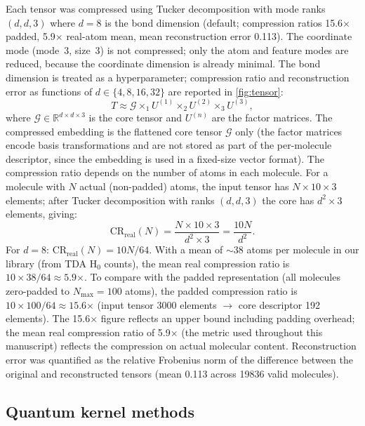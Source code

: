\documentclass[11pt,a4paper]{article}
\begin{document}
Each tensor was compressed using Tucker decomposition \citep{tensorly_2019} with mode ranks $(d, d, 3)$ where $d = 8$ is the bond dimension (default; compression ratios \num{15.6}$\times$ padded, \num{5.9}$\times$ real-atom mean, mean reconstruction error \num{0.113}). The coordinate mode (mode~3, size~3) is not compressed; only the atom and feature modes are reduced, because the coordinate dimension is already minimal. The bond dimension is treated as a hyperparameter; compression ratio and reconstruction error as functions of $d \in \{4, 8, 16, 32\}$ are reported in \cref{fig:tensor}:
\begin{equation}
T \approx \mathcal{G} \times_1 U^{(1)} \times_2 U^{(2)} \times_3 U^{(3)},
\end{equation}
where $\mathcal{G} \in \mathbb{R}^{d \times d \times 3}$ is the core tensor and $U^{(n)}$ are the factor matrices. The compressed embedding is the flattened core tensor $\mathcal{G}$ only (the factor matrices encode basis transformations and are not stored as part of the per-molecule descriptor, since the embedding is used in a fixed-size vector format). The compression ratio depends on the number of atoms in each molecule. For a molecule with $N$ actual (non-padded) atoms, the input tensor has $N \times 10 \times 3$ elements; after Tucker decomposition with ranks $(d, d, 3)$ the core has $d^2 \times 3$ elements, giving:
\begin{equation}
\mathrm{CR}_{\text{real}}(N) = \frac{N \times 10 \times 3}{d^2 \times 3} = \frac{10N}{d^2}.
\end{equation}
For $d = 8$: $\mathrm{CR}_{\text{real}}(N) = 10N / 64$. With a mean of $\sim$38 atoms per molecule in our library (from TDA H$_0$ counts), the mean real compression ratio is $10 \times 38 / 64 \approx \num{5.9}$$\times$. To compare with the padded representation (all molecules zero-padded to $N_{\max}=100$ atoms), the padded compression ratio is $10 \times 100 / 64 \approx \num{15.6}$$\times$ (input tensor \num{3000} elements $\to$ core descriptor \num{192} elements). The \num{15.6}$\times$ figure reflects an upper bound including padding overhead; the mean real compression ratio of \num{5.9}$\times$ (the metric used throughout this manuscript) reflects the compression on actual molecular content. Reconstruction error was quantified as the relative Frobenius norm of the difference between the original and reconstructed tensors (mean \num{0.113} across \num{19836} valid molecules).

\subsection{Quantum kernel methods}
\end{document}

